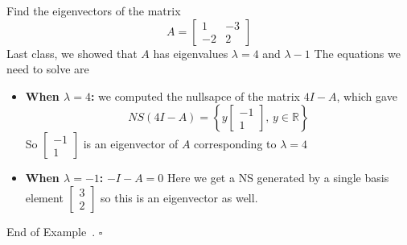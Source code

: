 \documentclass[10pt]{article}
\theoremstyle{definition}
\newtheorem{example}[theorem]{Example}
\renewenvironment{example}
{\begin{oldexample}}
  {\par\smallskip\hfill   End of Example~\theexample. $\square$    \par\end{oldexample}}
\newcommand{\R}{\mathbb{R}}           %
\begin{document}
\begin{example}
  Find the eigenvectors of the matrix
  \begin{equation*}
    A=
    \begin{bmatrix}
      1&-3\\
      -2&2
    \end{bmatrix}
  \end{equation*}
  Last class, we showed that $A$ has eigenvalues $\lambda=4$ and $\lambda-1$ 
  The equations we need to solve are
  \begin{itemize}
    \item \textbf{When $\lambda=4$:} we computed the nullsapce of the matrix $4I-A$,
    which gave
    \begin{equation*}
      NS(4I-A) = \left\{y 
        \begin{bmatrix}
          -1\\1
        \end{bmatrix}, \, y\in \R
      \right\} 
    \end{equation*}
    So $
    \begin{bmatrix}
      -1\\1
    \end{bmatrix}
    $
    is an eigenvector of $A$ corresponding to $\lambda=4$
    \item \textbf{When $\lambda=-1$:} $-I-A=0$
    Here we get a NS generated by a single basis element $
    \begin{bmatrix}
      3\\2
    \end{bmatrix}
    $
    so this is an eigenvector as well.
  \end{itemize}
\end{example}
\end{document}
